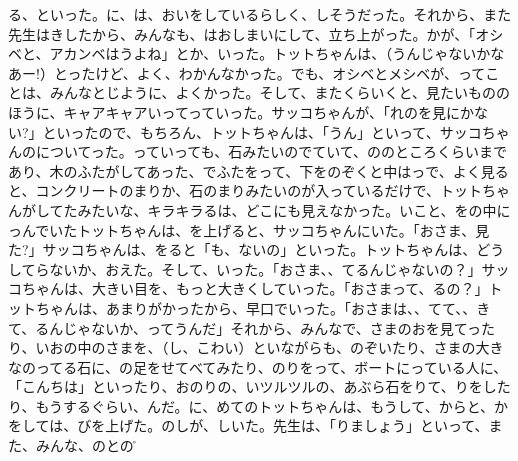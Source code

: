 る、といった。に、は、おいをしているらしく、しそうだった。それから、また先生はきしたから、みんなも、はおしまいにして、立ち上がった。かが、「オシベと、アカンベはうよね」とか、いった。トットちゃんは、（うんじゃないかなあー!）とったけど、よく、わかんなかった。でも、オシベとメシベが、ってことは、みんなとじように、よくかった。そして、またくらいくと、見たいもののほうに、キャアキャアいってっていった。サッコちゃんが、「れのを見にかない?」といったので、もちろん、トットちゃんは、「うん」といって、サッコちゃんのについてった。っていっても、石みたいのでていて、ののところくらいまであり、木のふたがしてあった、でふたをって、下をのぞくと中はっで、よく見ると、コンクリートのまりか、石のまりみたいのが入っているだけで、トットちゃんがしてたみたいな、キラキラるは、どこにも見えなかった。いこと、をの中にっんでいたトットちゃんは、を上げると、サッコちゃんにいた。「おさま、見た?」サッコちゃんは、をると「も、ないの」といった。トットちゃんは、どうしてらないか、おえた。そして、いった。「おさま、、てるんじゃないの？」サッコちゃんは、大きい目を、もっと大きくしていった。「おさまって、るの？」トットちゃんは、あまりがかったから、早口でいった。「おさまは、、てて、、きて、るんじゃないか、ってうんだ」それから、みんなで、さまのおを見てったり、いおの中のさまを、（し、こわい）といながらも、のぞいたり、さまの大きなのってる石に、の足をせてべてみたり、のりをって、ボートにっている人に、「こんちは」といったり、おのりの、いツルツルの、あぶら石をりて、りをしたり、もうするぐらい、んだ。に、めてのトットちゃんは、もうして、からと、かをしては、びを上げた。のしが、しいた。先生は、「りましょう」といって、また、みんな、のとのの\r